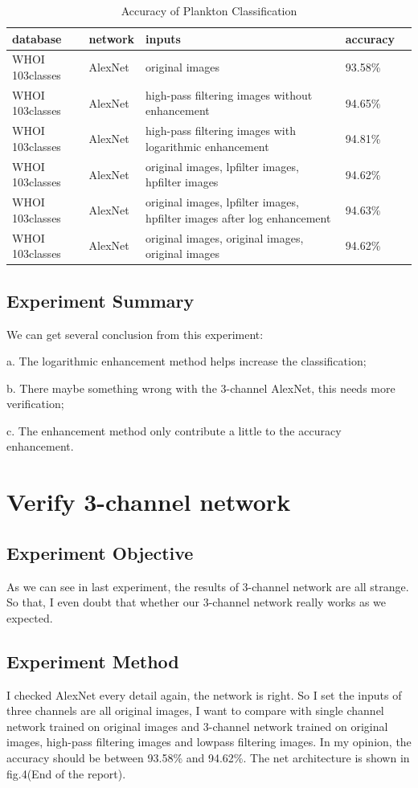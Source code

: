 \documentclass{article}
\begin{document}
\begin{table}[!ht]
  \caption{Accuracy of Plankton Classification}
  \centering
  \begin{tabular}{lllll}
    \toprule
    \cmidrule{1-4}
    database &network    &inputs       &accuracy  \\
    \midrule
    WHOI 103classes & AlexNet &original images   & 93.58\% \\ \hline
    WHOI 103classes & AlexNet &high-pass filtering images without enhancement   & 94.65\%  \\ \hline
    WHOI 103classes & AlexNet &high-pass filtering images with logarithmic enhancement   & 94.81\% \\ \hline
    WHOI 103classes & AlexNet &original images, lpfilter images, hpfilter images  & 94.62\% \\ \hline
    WHOI 103classes &AlexNet &original images, lpfilter images, hpfilter images after log enhancement   & 94.63\% \\ \hline
    WHOI 103classes & AlexNet &original images, original images, original images  & 94.62\%  \\
    \bottomrule
  \end{tabular}
\end{table}
\subsection{Experiment Summary}
We can get several conclusion from this experiment:

a. The logarithmic enhancement method helps increase the classification;

b. There maybe something wrong with the 3-channel AlexNet, this needs more verification;

c. The enhancement method only contribute a little to the accuracy enhancement.


\section{Verify 3-channel network}
\subsection{Experiment Objective}
As we can see in last experiment, the results of 3-channel network are all strange. So that, I even doubt that whether our 3-channel network really works as we expected. 
\subsection{Experiment Method}
I checked AlexNet every detail again, the network is right. So I set the inputs of three channels are all original images, I want to compare with single channel network trained on original images and 3-channel network trained on original images, high-pass filtering images and lowpass filtering images.  In my opinion, the accuracy should be between 93.58\% and 94.62\%. The net architecture is shown in fig.4(End of the report).
\end{document}
